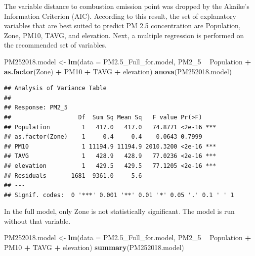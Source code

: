 \documentclass[12pt,]{article}
\newenvironment{Shaded}{\begin{snugshade}}{\end{snugshade}}
\newcommand{\KeywordTok}[1]{\textcolor[rgb]{0.13,0.29,0.53}{\textbf{#1}}}
\newcommand{\DataTypeTok}[1]{\textcolor[rgb]{0.13,0.29,0.53}{#1}}
\newcommand{\DecValTok}[1]{\textcolor[rgb]{0.00,0.00,0.81}{#1}}
\newcommand{\StringTok}[1]{\textcolor[rgb]{0.31,0.60,0.02}{#1}}
\newcommand{\OperatorTok}[1]{\textcolor[rgb]{0.81,0.36,0.00}{\textbf{#1}}}
\newcommand{\NormalTok}[1]{#1}
\begin{document}
The variable distance to combustion emission point was dropped by the
Akaike's Information Criterion (AIC). According to this result, the set
of explanatory variables that are best suited to predict PM 2.5
concentration are Population, Zone, PM10, TAVG, and elevation. Next, a
multiple regression is performed on the recommended set of variables.

\begin{Shaded}
\begin{Highlighting}[]
\NormalTok{PM252018.model <-}\StringTok{ }
\StringTok{  }\KeywordTok{lm}\NormalTok{(}\DataTypeTok{data =}\NormalTok{ PM2.5_Full_for.model, PM2_}\DecValTok{5} \OperatorTok{~}\StringTok{ }
\StringTok{       }\NormalTok{Population }\OperatorTok{+}\StringTok{ }\KeywordTok{as.factor}\NormalTok{(Zone) }\OperatorTok{+}\StringTok{ }\NormalTok{PM10 }\OperatorTok{+}\StringTok{ }\NormalTok{TAVG }\OperatorTok{+}\StringTok{ }\NormalTok{elevation)}
\KeywordTok{anova}\NormalTok{(PM252018.model)}
\end{Highlighting}
\end{Shaded}

\begin{verbatim}
## Analysis of Variance Table
## 
## Response: PM2_5
##                   Df  Sum Sq Mean Sq   F value Pr(>F)    
## Population         1   417.0   417.0   74.8771 <2e-16 ***
## as.factor(Zone)    1     0.4     0.4    0.0643 0.7999    
## PM10               1 11194.9 11194.9 2010.3200 <2e-16 ***
## TAVG               1   428.9   428.9   77.0236 <2e-16 ***
## elevation          1   429.5   429.5   77.1205 <2e-16 ***
## Residuals       1681  9361.0     5.6                     
## ---
## Signif. codes:  0 '***' 0.001 '**' 0.01 '*' 0.05 '.' 0.1 ' ' 1
\end{verbatim}

In the full model, only Zone is not statistically significant. The model
is run without that variable.

\begin{Shaded}
\begin{Highlighting}[]
\NormalTok{PM252018.model <-}\StringTok{ }
\StringTok{  }\KeywordTok{lm}\NormalTok{(}\DataTypeTok{data =}\NormalTok{ PM2.5_Full_for.model, PM2_}\DecValTok{5} \OperatorTok{~}\StringTok{ }
\StringTok{       }\NormalTok{Population }\OperatorTok{+}\StringTok{ }\NormalTok{PM10 }\OperatorTok{+}\StringTok{ }\NormalTok{TAVG }\OperatorTok{+}\StringTok{ }\NormalTok{elevation)}
\KeywordTok{summary}\NormalTok{(PM252018.model)}
\end{Highlighting}
\end{Shaded}
\end{document}
